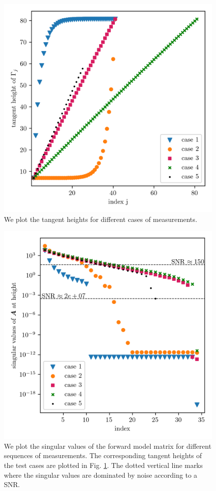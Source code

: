 \begin{figure}[ht!]
	\centering
	\includegraphics{MeasTangHeight.png}
	\caption[Tangent heights for different sequences of measurements.]{We plot the tangent heights for different cases of measurements.}
	\label{fig:TangHCases}
\end{figure}
\begin{figure}[ht!]
	\centering
	\includegraphics{SingValA.png}
	\caption[Singular values of linear forward model matrix for different sequences of measurements.]{We plot the singular values of the forward model matrix for different sequences of measurements.
		The corresponding tangent heights of the test cases are plotted in Fig. \ref{fig:TangHCases}. The dotted vertical line marks where the singular values are dominated by noise according to a SNR.}
	\label{fig:SingA}
\end{figure}
